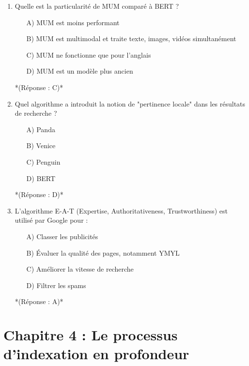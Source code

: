 \documentclass[12pt,a4paper,twoside]{report}
\begin{document}
\begin{enumerate}
\item Quelle est la particularité de MUM comparé à BERT ?
\begin{itemize}
\item[A)] MUM est moins performant
\item[B)] MUM est multimodal et traite texte, images, vidéos simultanément
\item[C)] MUM ne fonctionne que pour l'anglais
\item[D)] MUM est un modèle plus ancien
\end{itemize}
*(Réponse : C)*

\item Quel algorithme a introduit la notion de "pertinence locale" dans les résultats de recherche ?
\begin{itemize}
\item[A)] Panda
\item[B)] Venice
\item[C)] Penguin
\item[D)] BERT
\end{itemize}
*(Réponse : D)*

\item L'algorithme E-A-T (Expertise, Authoritativeness, Trustworthiness) est utilisé par Google pour :
\begin{itemize}
\item[A)] Classer les publicités
\item[B)] Évaluer la qualité des pages, notamment YMYL
\item[C)] Améliorer la vitesse de recherche
\item[D)] Filtrer les spams
\end{itemize}
*(Réponse : A)*
\end{enumerate}

\newpage

\section*{Chapitre 4 : Le processus d'indexation en profondeur}
\end{document}
